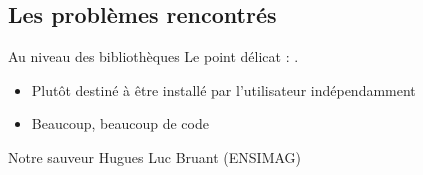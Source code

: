 \subsection{Les problèmes rencontrés}

    \begin{frame}{Au niveau des bibliothèques}
        Le point délicat : \qcodeedit{}.
        \pause
        \begin{itemize}
        	\item Plutôt destiné à être installé par l'utilisateur indépendamment
        	\item Beaucoup, beaucoup de code
        \end{itemize}
        \pause
        \begin{alertblock}{Notre sauveur}
            Hugues Luc Bruant (ENSIMAG)
        \end{alertblock}
    \end{frame}
		
